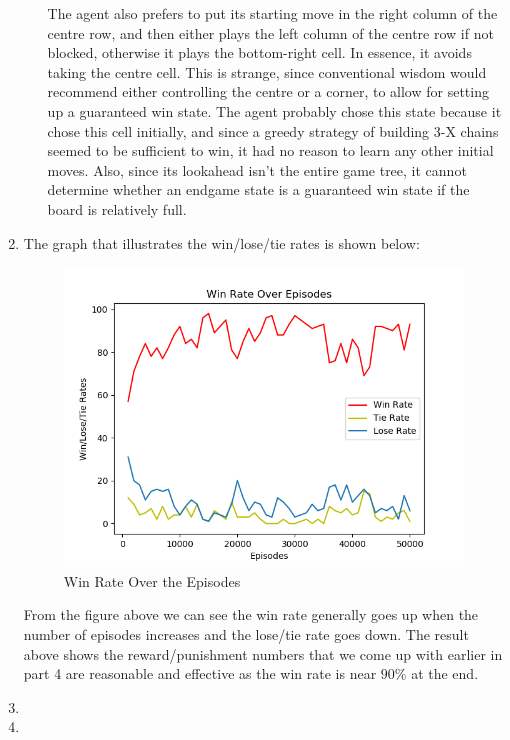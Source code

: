 \documentclass[10pt,letterpaper]{article}
\begin{document}
\begin{enumerate}
\begin{enumerate}
			The agent also prefers to put its starting move in the right column of the centre row, and then either plays the left column of the centre row if not blocked, otherwise it plays the bottom-right cell.
			In essence, it avoids taking the centre cell.
			This is strange, since conventional wisdom would recommend either controlling the centre or a corner, to allow for setting up a guaranteed win state.
			The agent probably chose this state because it chose this cell initially, and since a greedy strategy of building 3-X chains seemed to be sufficient to win, it had no reason to learn any other initial moves.
			Also, since its lookahead isn't the entire game tree, it cannot determine whether an endgame state is a guaranteed win state if the board is relatively full.
		\end{enumerate}
		\item %
		The graph that illustrates the win/lose/tie rates is shown below:

		\begin{figure}[H]
				\centering
				\includegraphics[width=0.7\linewidth]{Part6LearningCurve.png}
				\caption{Win Rate Over the Episodes}
				\label{fig:part6}
		\end{figure}

		From the figure above we can see the win rate generally goes up when the number of episodes increases and the lose/tie rate goes down. The result above shows the reward/punishment numbers that we come up with earlier in part 4 are reasonable and effective as the win rate is near $90\%$ at the end.

		\item %
		\item %
	\end{enumerate}
\end{document}
